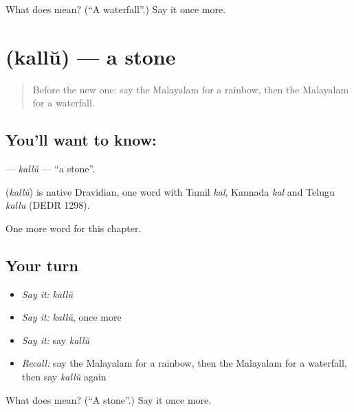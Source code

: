 \begin{tcolorbox}[breakable,colback=teal!4,colframe=teal!35!black,title={Before you move on}]
What does  mean? (\textquotedblleft{}A waterfall\textquotedblright{}.) Say it once more.
\end{tcolorbox}
\section[\texorpdfstring{\ml{കല്ല്} (kallŭ)}{കല്ല് (kallŭ)}]{ (kallŭ) — a stone}

\label{lesson:ML-C160-kallu}



\begin{quote}
Before the new one: say the Malayalam for a rainbow, then the Malayalam for a waterfall.
\end{quote}

\subsection*{You'll want to know: }
\textbf{} — \emph{kallŭ} — \textquotedblleft{}a stone\textquotedblright{}.

\begin{cousinweb}
\textbf{} (\emph{kallŭ}) is native Dravidian, one word with Tamil \emph{kal}, Kannada \emph{kal} and Telugu \emph{kallu} (DEDR 1298).
\end{cousinweb}

\begin{grammarlens}[title={What you've built}]
One more word for this chapter.
\end{grammarlens}

\subsection*{Your turn}
\begin{itemize}
\raggedright
  \item \emph{Say it:} \emph{kallŭ}
  \item \emph{Say it:} \emph{kallŭ}, once more
  \item \emph{Say it:} say \emph{kallŭ}
  \item \emph{Recall:} say the Malayalam for a rainbow, then the Malayalam for a waterfall, then say \emph{kallŭ} again
\end{itemize}

\begin{tcolorbox}[breakable,colback=teal!4,colframe=teal!35!black,title={Before you move on}]
What does  mean? (\textquotedblleft{}A stone\textquotedblright{}.) Say it once more.
\end{tcolorbox}
